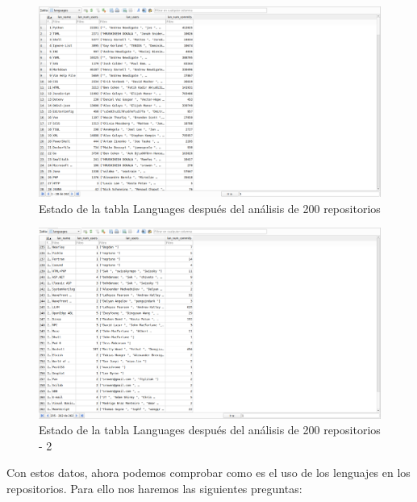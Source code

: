 \documentclass[a4paper, 12pt]{book}
\begin{document}
\begin{figure}[H]
  \centering
  \includegraphics[width=1\textwidth]{img/tablalan1.png}
  \caption{Estado de la tabla Languages después del análisis de 200 repositorios}
  \label{figura:lanafter1}
\end{figure}

\begin{figure}[H]
  \centering
  \includegraphics[width=1\textwidth]{img/tablalan2.png}
  \caption{Estado de la tabla Languages después del análisis de 200 repositorios - 2}
  \label{figura:lanafter2}
\end{figure}


Con estos datos, ahora podemos comprobar como es el uso de los lenguajes en los repositorios. Para ello nos haremos las siguientes preguntas:
\end{document}
